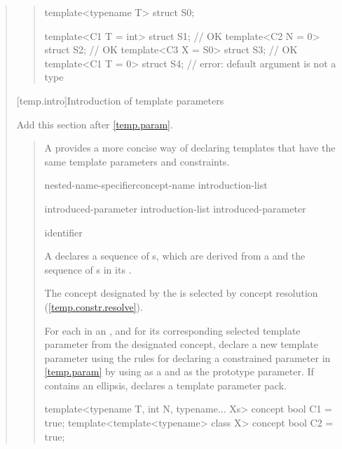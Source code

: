 \begin{quote}
\begin{quote}
\begin{codeblock}
template<typename T> struct S0;

template<C1 T = int> struct S1; // OK
template<C2 N = 0> struct S2;   // OK
template<C3 X = S0> struct S3;  // OK
template<C1 T = 0> struct S4;   // error: default argument is not a type
\end{codeblock}
\exitexample
\end{quote}


[temp.intro]{Introduction of template parameters}

Add this section after \ref{temp.param}.

\begin{quote}

\pnum
A  provides a more concise way of declaring
templates that have the same template parameters and constraints.

\begin{bnf}
\br
  nested-name-specifier\opt concept-name \terminal{\{} introduction-list \terminal{\}}

\br
  introduced-parameter\br
  introduction-list \terminal{,} introduced-parameter

\br
    \opt identifier
\end{bnf}

A  declares a sequence of 
s, which are derived from a 
 and the sequence of s in
its .

\pnum
The concept designated by the  is selected by 
concept resolution (\ref{temp.constr.resolve}).

\pnum
For each   in an
, and for its corresponding selected template 
parameter  from the designated concept, declare a new template
parameter using the rules for declaring a constrained parameter in
\ref{temp.param} by using  as a  and 
 as the prototype parameter.
% 
% 
If  contains an ellipsis,  declares a template 
parameter pack.
% 
\enterexample
\begin{codeblock}
template<typename T, int N, typename... Xs> concept bool C1 = true;
template<template<typename> class X> concept bool C2 = true;


\end{codeblock}
\end{quote}
\end{quote}
